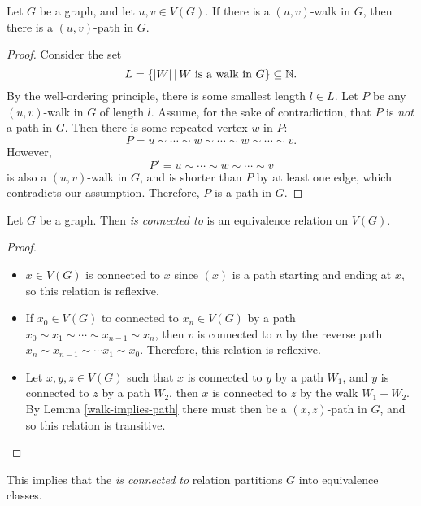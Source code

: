 \begin{lemma}\label{walk-implies-path}
    Let $G$ be a graph, and let $u, v \in V(G)$. If there is a $(u, v)$-walk in $G$, then there is a $(u, v)$-path in $G$.
\end{lemma}

\begin{proof}
    Consider the set \[L = \left\{|W| \,\middle|\, W \textrm{ is a walk in } G\right\} \subseteq \mathbb{N}.\] By the well-ordering principle, there is some smallest length $l \in L$. Let $P$ be any $(u,v)$-walk in $G$ of length $l$. Assume, for the sake of contradiction, that $P$ is \emph{not} a path in $G$. Then there is some repeated vertex $w$ in $P$: \[P = u \sim \cdots \sim w \sim \cdots \sim w \sim \cdots \sim v.\] However, \[P' = u \sim \cdots \sim w \sim \cdots \sim v\] is also a $(u, v)$-walk in $G$, and is shorter than $P$ by at least one edge, which contradicts our assumption. Therefore, $P$ is a path in $G$.
\end{proof}

\begin{prop}
    Let $G$ be a graph. Then \emph{is connected to} is an equivalence relation on $V(G)$.
\end{prop}

\begin{proof}\proofbreak
    \begin{itemize}
        \item $x \in V(G)$ is connected to $x$ since $(x)$ is a path starting and ending at $x$, so this relation is reflexive.
        \item If $x_0 \in V(G)$ to connected to $x_n \in V(G)$ by a path $x_0 \sim x_1 \sim \cdots \sim x_{n-1} \sim x_n$, then $v$ is connected to $u$ by the reverse path $x_n \sim x_{n-1} \sim \cdots x_1 \sim x_0$. Therefore, this relation is reflexive.
        \item Let $x, y, z \in V(G)$ such that $x$ is connected to $y$ by a path $W_1$, and $y$ is connected to $z$ by a path $W_2$, then $x$ is connected to $z$ by the walk $W_1 + W_2$. By Lemma \ref{walk-implies-path} there must then be a $(x, z)$-path in $G$, and so this relation is transitive.
    \end{itemize}
\end{proof}

\begin{rmk}
    This implies that the \emph{is connected to} relation partitions $G$ into equivalence classes.
\end{rmk}

